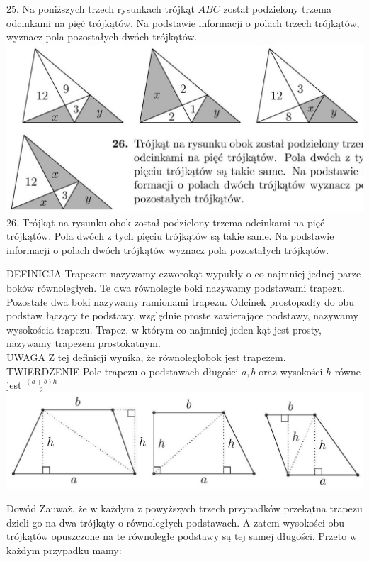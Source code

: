 \documentclass[10pt]{article}
\begin{document}
25. Na poniższych trzech rysunkach trójkąt \(A B C\) został podzielony trzema odcinkami na pięć trójkątów. Na podstawie informacji o polach trzech trójkątów, wyznacz pola pozostałych dwóch trójkątów.\\
\includegraphics[max width=\textwidth, center]{2024_11_21_71f62bd117d375398909g-036(2)}\\
26. Trójkąt na rysunku obok został podzielony trzema odcinkami na pięć trójkątów. Pola dwóch z tych pięciu trójkątów są takie same. Na podstawie informacji o polach dwóch trójkątów wyznacz pola pozostałych trójkątów.

DEFINICJA Trapezem nazywamy czworokąt wypukły o co najmniej jednej parze boków równoległych. Te dwa równoległe boki nazywamy podstawami trapezu. Pozostałe dwa boki nazywamy ramionami trapezu. Odcinek prostopadły do obu podstaw łączący te podstawy, względnie proste zawierające podstawy, nazywamy wysokościa trapezu. Trapez, w którym co najmniej jeden kąt jest prosty, nazywamy trapezem prostokatnym.\\
UWAGA Z tej definicji wynika, że równoległobok jest trapezem.\\
TWIERDZENIE Pole trapezu o podstawach długości \(a, b\) oraz wysokości \(h\) równe jest \(\frac{(a+b) h}{2}\)\\
\includegraphics[max width=\textwidth, center]{2024_11_21_71f62bd117d375398909g-036(1)}

Dowód Zauważ, że w każdym z powyższych trzech przypadków przekątna trapezu dzieli go na dwa trójkąty o równoległych podstawach. A zatem wysokości obu trójkątów opuszczone na te równoległe podstawy są tej samej długości. Przeto w każdym przypadku mamy:
\end{document}
